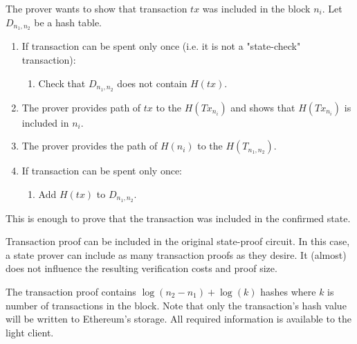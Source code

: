 The prover wants to show that transaction $tx$ was included in the block $n_i$.
Let $D_{n_1, n_2}$ be a hash table.
\begin{enumerate}
    \item If transaction can be spent only once (i.e. it is not a "state-check" transaction):
        \begin{enumerate}
            \item Check that $D_{n_1, n_2}$ does not contain $H(tx)$. 
        \end{enumerate}
    \item The prover provides path of $tx$ to the $H(Tx_{n_i})$ and shows that $H(Tx_{n_i})$ is included in $n_i$.
    \item The prover provides the path of $H(n_i)$ to the $H(T_{n_1, n_2})$.
    \item If transaction can be spent only once:
        \begin{enumerate}
            \item Add $H(tx)$ to $D_{n_1, n_2}$. 
        \end{enumerate}
\end{enumerate} 
This is enough to prove that the transaction was included in the confirmed state. 

\begin{remark}
    Transaction proof can be included in the original state-proof circuit.
    In this case, a state prover can include as many transaction proofs as they desire.
    It (almost) does not influence the resulting verification costs and proof size.
\end{remark}

The transaction proof contains $\log(n_2 - n_1) + \log(k)$ hashes where $k$ is number of transactions in the block. 
Note that only the transaction's hash value will be written to Ethereum's storage.
All required information is available to the light client.












